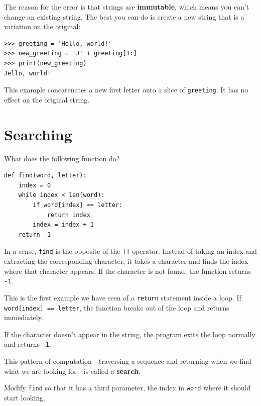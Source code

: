 \documentclass[10pt]{book}
\begin{document}

The reason for the error is that
strings are {\bf immutable}, which means you can't change an
existing string.  The best you can do is create a new string
that is a variation on the original:

\beforeverb
\begin{verbatim}
>>> greeting = 'Hello, world!'
>>> new_greeting = 'J' + greeting[1:]
>>> print(new_greeting)
Jello, world!
\end{verbatim}
\afterverb
%
This example concatenates a new first letter onto
a slice of {\tt greeting}.  It has no effect on
the original string.



\section{Searching}
\label{find}

What does the following function do?


\beforeverb
\begin{verbatim}
def find(word, letter):
    index = 0
    while index < len(word):
        if word[index] == letter:
            return index
        index = index + 1
    return -1
\end{verbatim}
\afterverb
%
In a sense, {\tt find} is the opposite of the {\tt []} operator.
Instead of taking an index and extracting the corresponding character,
it takes a character and finds the index where that character
appears.  If the character is not found, the function returns {\tt
-1}.

This is the first example we have seen of a {\tt return} statement
inside a loop.  If {\tt word[index] == letter}, the function breaks
out of the loop and returns immediately.

If the character doesn't appear in the string, the program
exits the loop normally and  returns {\tt -1}.

This pattern of computation---traversing a sequence and returning
when we find what we are looking for---is called a {\bf search}.


\begin{ex}
Modify {\tt find} so that it has a
third parameter, the index in {\tt word} where it should start
looking.
\end{ex}
\end{document}
